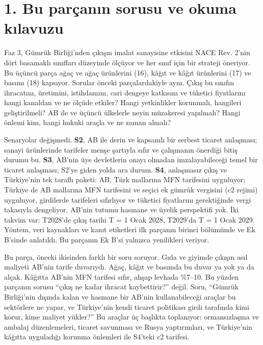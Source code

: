\hypertarget{nace_kartlar_16-18-1-bu-paruxe7anux131n-sorusu-ve-okuma-kux131lavuzu}{%
\section{1. Bu parçanın sorusu ve okuma kılavuzu}\label{nace_kartlar_16-18-1-bu-paruxe7anux131n-sorusu-ve-okuma-kux131lavuzu}}

Faz 3, Gümrük Birliği'nden çıkışın imalat sanayisine etkisini NACE Rev. 2'nin dört basamaklı sınıfları düzeyinde ölçüyor ve her sınıf için bir strateji öneriyor. Bu üçüncü parça ağaç ve ağaç ürünlerini (16), kâğıt ve kâğıt ürünlerini (17) ve basımı (18) kapsıyor. Sorular önceki parçalardakiyle aynı. Çıkış bu sınıfın ihracatını, üretimini, istihdamını, cari dengeye katkısını ve tüketici fiyatlarını hangi kanaldan ve ne ölçüde etkiler? Hangi yetkinlikler korunmalı, hangileri geliştirilmeli? AB ile ve üçüncü ülkelerle neyin müzakeresi yapılmalı? Hangi önlemi kim, hangi hukuki araçla ve ne zaman almalı?

Senaryolar değişmedi. \textbf{S2}, AB ile derin ve kapsamlı bir serbest ticaret anlaşması; sanayi ürünlerinde tarifeler menşe şartıyla sıfır ve çalışmanın önerdiği bitiş durumu bu. \textbf{S3}, AB'nin üye devletlerin onayı olmadan imzalayabileceği temel bir ticaret anlaşması; S2'ye giden yolda ara durum. \textbf{S4}, anlaşmasız çıkış ve Türkiye'nin tek taraflı paketi: AB, Türk mallarına MFN tarifesini uyguluyor; Türkiye de AB mallarına MFN tarifesini ve seçici ek gümrük vergisini (c2 rejimi) uyguluyor, girdilerde tarifeleri sıfırlıyor ve tüketici fiyatlarını gerektiğinde vergi takasıyla dengeliyor. AB'nin tutumu hasmane ve üyelik perspektifi yok. İki takvim var: T2028'de çıkış tarihi T = 1 Ocak 2028, T2029'da T = 1 Ocak 2029. Yöntem, veri kaynakları ve kanıt etiketleri ilk parçanın birinci bölümünde ve Ek B'sinde anlatıldı. Bu parçanın Ek B'si yalnızca yenilikleri veriyor.

Bu parça, önceki ikisinden farklı bir soru soruyor. Gıda ve giyimde çıkışın asıl maliyeti AB'nin tarife duvarıydı. Ağaç, kâğıt ve basımda bu duvar ya yok ya da alçak. Kâğıtta AB'nin MFN tarifesi sıfır, ahşap levhada \%7--10. Bu yüzden parçanın sorusu ``çıkış ne kadar ihracat kaybettirir?'' değil. Soru, ``Gümrük Birliği'nin dışında kalan ve hasmane bir AB'nin kullanabileceği araçlar bu sektörlere ne yapar, ve Türkiye'nin kendi ticaret politikası girdi tarafında kimi korur, kime maliyet yükler?'' Bu araçlar üç başlıkta toplanıyor: ormansızlaşma ve ambalaj düzenlemeleri, ticaret savunması ve Rusya yaptırımları, ve Türkiye'nin kâğıtta uyguladığı korunma önlemleri ile S4'teki c2 tarifesi.

